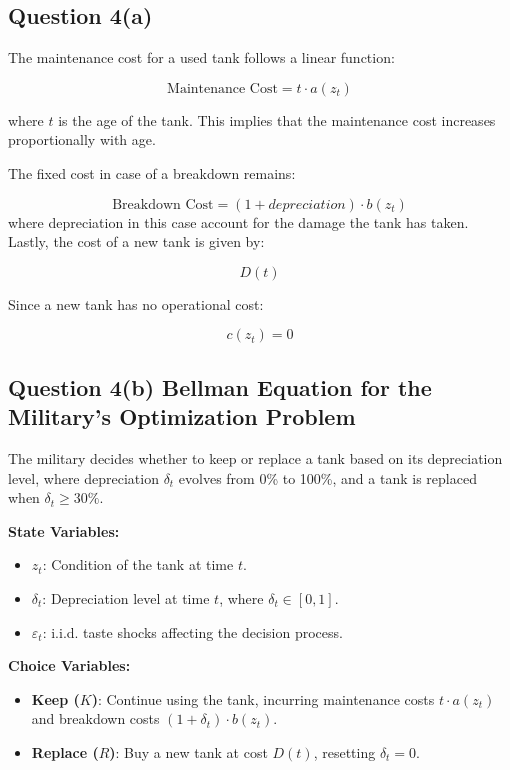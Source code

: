 \documentclass{article}
\begin{document}
\subsection*{Question 4(a)}

The maintenance cost for a used tank follows a linear function:

\[
\text{Maintenance Cost} = t \cdot a(z_t)
\]

where \( t \) is the age of the tank. This implies that the maintenance cost increases proportionally with age.

The fixed cost in case of a breakdown remains:

\[
\text{Breakdown Cost} = (1 + depreciation) \cdot b(z_t)
\]
where depreciation in this case account for the damage the tank has taken.
Lastly, the cost of a new tank is given by:

\[
D(t)
\]

Since a new tank has no operational cost:

\[
c(z_t) = 0
\]

\subsection*{Question 4(b) Bellman Equation for the Military's Optimization Problem}

The military decides whether to keep or replace a tank based on its depreciation level, where depreciation \(\delta_t\) evolves from 0\% to 100\%, and a tank is replaced when \(\delta_t \geq 30\%\).

\textbf{State Variables:}
\begin{itemize}
    \item \( z_t \): Condition of the tank at time \( t \).
    \item \( \delta_t \): Depreciation level at time \( t \), where \( \delta_t \in [0,1] \).
    \item \( \varepsilon_t \): i.i.d. taste shocks affecting the decision process.
\end{itemize}

\textbf{Choice Variables:}
\begin{itemize}
    \item \textbf{Keep (\( K \))}: Continue using the tank, incurring maintenance costs \( t \cdot a(z_t) \) and breakdown costs \( (1+\delta_t) \cdot b(z_t) \).
    \item \textbf{Replace (\( R \))}: Buy a new tank at cost \( D(t) \), resetting \( \delta_t = 0 \).
\end{itemize}
\end{document}
